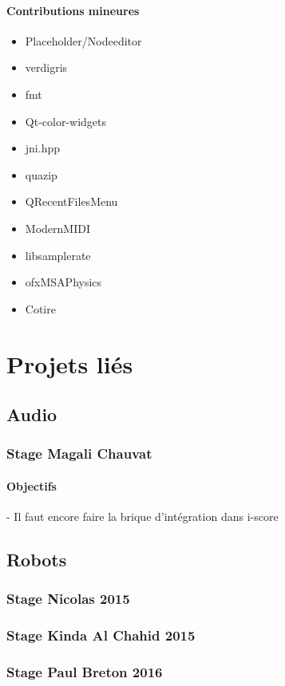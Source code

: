 \documentclass[french,a4paper]{book}
\begin{document}
\paragraph{Contributions mineures}
\begin{itemize}
\item Placeholder/Nodeeditor
\item verdigris
\item fmt
\item Qt-color-widgets
\item jni.hpp
\item quazip
\item QRecentFilesMenu
\item ModernMIDI
\item libsamplerate
\item ofxMSAPhysics
\item Cotire
\end{itemize}

\section{Projets liés}

\subsection{Audio}

\subsubsection{Stage Magali Chauvat}
\paragraph{Objectifs}

- Il faut encore faire la brique d'intégration dans i-score
\subsection{Robots}
\subsubsection{Stage Nicolas 2015}
\subsubsection{Stage Kinda Al Chahid 2015}

\subsubsection{Stage Paul Breton 2016}
\end{document}
